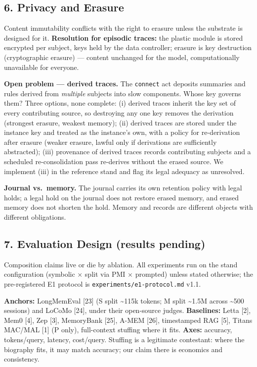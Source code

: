 \documentclass[
]{article}
\newcounter{none} %
\begin{document}
\subsection{6. Privacy and Erasure}\label{privacy-and-erasure}

Content immutability conflicts with the right to erasure unless the
substrate is designed for it. \textbf{Resolution for episodic traces:}
the plastic module is stored encrypted per subject, keys held by the
data controller; erasure is key destruction (cryptographic erasure) ---
content unchanged for the model, computationally unavailable for
everyone.

\textbf{Open problem --- derived traces.} The \texttt{connect} act
deposits summaries and rules derived from \emph{multiple} subjects into
slow components. Whose key governs them? Three options, none complete:
(i) derived traces inherit the key set of every contributing source, so
destroying any one key removes the derivation (strongest erasure,
weakest memory); (ii) derived traces are stored under the instance key
and treated as the instance's own, with a policy for re-derivation after
erasure (weaker erasure, lawful only if derivations are sufficiently
abstracted); (iii) provenance of derived traces records contributing
subjects and a scheduled re-consolidation pass re-derives without the
erased source. We implement (iii) in the reference stand and flag its
legal adequacy as unresolved.

\textbf{Journal vs.~memory.} The journal carries its own retention
policy with legal holds; a legal hold on the journal does not restore
erased memory, and erased memory does not shorten the hold. Memory and
records are different objects with different obligations.

\subsection{7. Evaluation Design (results
pending)}\label{evaluation-design-results-pending}

Composition claims live or die by ablation. All experiments run on the
stand configuration (symbolic × split via PMI × prompted) unless stated
otherwise; the pre-registered E1 protocol is
\texttt{experiments/e1-protocol.md} v1.1.

\textbf{Anchors:} LongMemEval {[}23{]} (S split \textasciitilde115k
tokens; M split \textasciitilde1.5M across \textasciitilde500 sessions)
and LoCoMo {[}24{]}, under their open-source judges. \textbf{Baselines:}
Letta {[}2{]}, Mem0 {[}4{]}, Zep {[}3{]}, MemoryBank {[}25{]}, A-MEM
{[}26{]}, timestamped RAG {[}5{]}, Titans MAC/MAL {[}1{]} (P only),
full-context stuffing where it fits. \textbf{Axes:} accuracy,
tokens/query, latency, cost/query. Stuffing is a legitimate contestant:
where the biography fits, it may match accuracy; our claim there is
economics and consistency.
\end{document}
